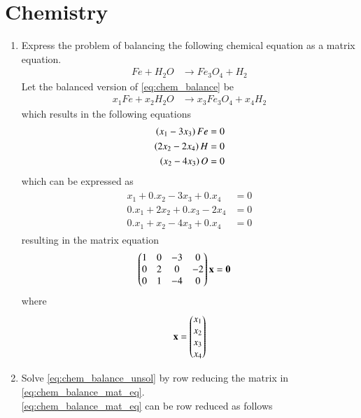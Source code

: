 \documentclass[journal,12pt,twocolumn]{IEEEtran}
\renewcommand\thesection{\arabic{section}}
\begin{document}
\section{Chemistry}
\begin{enumerate}[label=\arabic*.,ref=\thesection.\theenumi]
\item Express the problem of balancing the following chemical equation as a matrix equation.
%
\begin{align}
\label{eq:chem_balance}
Fe+H_2O &\rightarrow Fe_3O_4 + H_2
\end{align}
%
\solution Let the balanced version of \eqref{eq:chem_balance} be 
%
\begin{align}
\label{eq:chem_balance_unsol}
x_1Fe+x_2H_2 O &\rightarrow x_3Fe_3 O_4 + x_4H_2
\end{align}
%
which results in the following equations
%
\begin{align}
\begin{split}
\left(x_1 -3x_3\right)Fe &= 0
\\
\left(2x_2 -2x_4\right)H &= 0
\\
\left(x_2 -4x_3\right)O &= 0
\end{split}
\end{align}
which can be expressed as
\begin{align}
\begin{split}
x_1 + 0.x_2 -3x_3 +0.x_4&= 0
\\
0.x_1+2x_2 +0.x_3-2x_4 &= 0
\\
0.x_1+x_2 -4x_3+ 0.x_4 &= 0
\end{split}
\end{align}
%
resulting in the matrix equation
\begin{align}
\label{eq:chem_balance_mat_eq}
\begin{split}
\myvec{
1 & 0 & -3 & 0
\\
0 & 2 & 0 & -2
\\
0 & 1 & -4 & 0
}
\vec{x} &= \vec{0}
\end{split}
\end{align}
%
where
\begin{align}
\mathbf{x} = \begin{pmatrix}x_1 \\ x_2 \\ x_3 \\ x_4\end{pmatrix} 
\end{align}
\item Solve \eqref{eq:chem_balance_unsol} by row reducing 
the matrix in \eqref{eq:chem_balance_mat_eq}.
\\
\solution  \eqref{eq:chem_balance_mat_eq} can be row reduced as follows

\end{enumerate}
\end{document}
